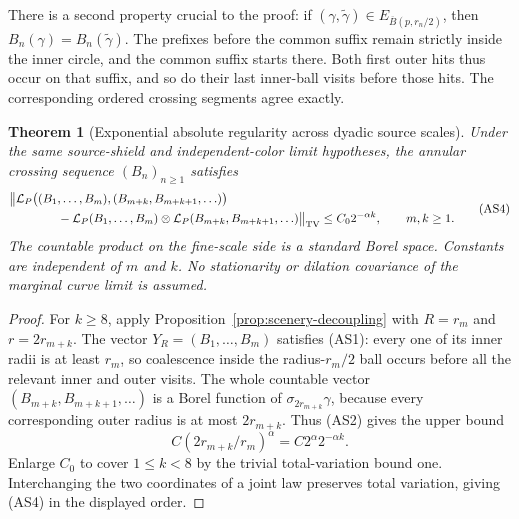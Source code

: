 \documentclass[11pt]{article}
\newtheorem{theorem}{Theorem}[section]
\theoremstyle{definition}\newtheorem{definition}[theorem]{Definition}
\theoremstyle{remark}\newtheorem{remark}[theorem]{Remark}
\begin{document}
There is a second property crucial to the proof: if
$(\gamma,\widetilde\gamma)\in E_{\overline B(p,r_n/2)}$, then
$B_n(\gamma)=B_n(\widetilde\gamma)$. The prefixes before the common
suffix remain strictly inside the inner circle, and the common suffix
starts there. Both first outer hits thus occur on that suffix, and so
do their last inner-ball visits before those hits. The corresponding
ordered crossing segments agree exactly.

\begin{theorem}[Exponential absolute regularity across dyadic source scales]
\label{thm:scenery-beta}
Under the same source-shield and independent-color limit hypotheses,
the annular crossing sequence $(B_n)_{n\ge1}$ satisfies
\[
 \begin{split}
 &\bigl\|\mathcal L_P\bigl((B_1,\ldots,B_m),
                                  (B_{m+k},B_{m+k+1},\ldots)\bigr)\\
 &\hspace{14mm}
 -\mathcal L_P(B_1,\ldots,B_m)
             \otimes\mathcal L_P(B_{m+k},B_{m+k+1},\ldots)
                         \bigr\|_{\rm TV}
 \le C_0 2^{-\alpha k},\qquad m,k\ge1.
 \end{split}
 \tag{AS4}
\]
The countable product on the fine-scale side is a standard Borel space.
Constants are independent of $m$ and $k$. No stationarity or dilation
covariance of the marginal curve limit is assumed.
\end{theorem}
\begin{proof}
For $k\ge8$, apply Proposition~\ref{prop:scenery-decoupling} with
$R=r_m$ and $r=2r_{m+k}$. The vector
$Y_R=(B_1,\ldots,B_m)$ satisfies (AS1): every one of its inner
radii is at least $r_m$, so coalescence inside the radius-$r_m/2$
ball occurs before all the relevant inner and outer visits. The whole
countable vector $(B_{m+k},B_{m+k+1},\ldots)$ is a Borel function of
$\sigma_{2r_{m+k}}\gamma$, because every corresponding outer radius
is at most $2r_{m+k}$. Thus (AS2) gives the upper bound
\[
 C(2r_{m+k}/r_m)^\alpha=C2^{\alpha}2^{-\alpha k}.
\]
Enlarge $C_0$ to cover $1\le k<8$ by the trivial total-variation bound
one. Interchanging the two coordinates of a joint law preserves total
variation, giving (AS4) in the displayed order.
\end{proof}
\end{document}
